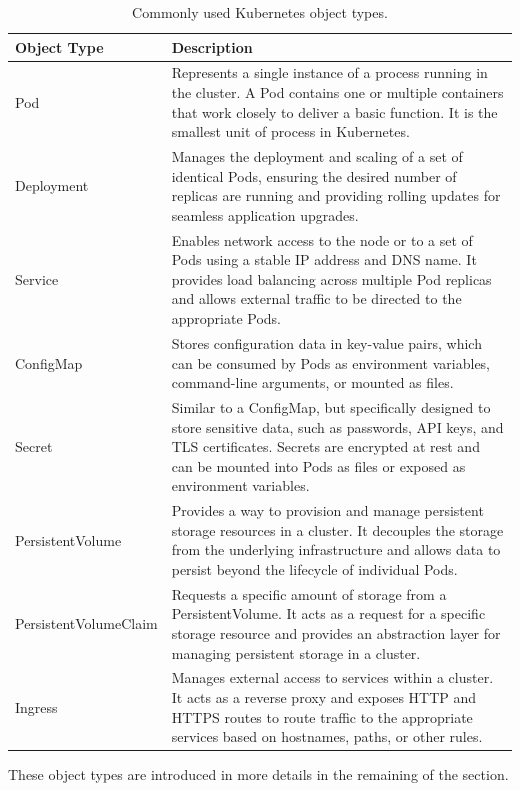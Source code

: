 \begin{table}[!htb]
	\centering
	\caption{Commonly used Kubernetes object types.} \label{ch:vac:tab:objtype}
	\begin{tabularx}{\textwidth}{lX}
		\hline
		Object Type & Description \\
		\hline
		Pod & Represents a single instance of a process running in the cluster. A Pod contains one or multiple containers that work closely to deliver a basic function. It is the smallest unit of process in Kubernetes. \\ \hline
		Deployment & Manages the deployment and scaling of a set of identical Pods, ensuring the desired number of replicas are running and providing rolling updates for seamless application upgrades. \\ \hline
		Service & Enables network access to the node or to a set of Pods using a stable IP address and DNS name. It provides load balancing across multiple Pod replicas and allows external traffic to be directed to the appropriate Pods. \\ \hline
		ConfigMap & Stores configuration data in key-value pairs, which can be consumed by Pods as environment variables, command-line arguments, or mounted as files. \\ \hline
		Secret & Similar to a ConfigMap, but specifically designed to store sensitive data, such as passwords, API keys, and TLS certificates. Secrets are encrypted at rest and can be mounted into Pods as files or exposed as environment variables. \\ \hline
		PersistentVolume & Provides a way to provision and manage persistent storage resources in a cluster. It decouples the storage from the underlying infrastructure and allows data to persist beyond the lifecycle of individual Pods. \\ \hline
		PersistentVolumeClaim & Requests a specific amount of storage from a PersistentVolume. It acts as a request for a specific storage resource and provides an abstraction layer for managing persistent storage in a cluster. \\ \hline
		Ingress & Manages external access to services within a cluster. It acts as a reverse proxy and exposes HTTP and HTTPS routes to route traffic to the appropriate services based on hostnames, paths, or other rules. \\
		\hline
	\end{tabularx}
\end{table}

These object types are introduced in more details in the remaining of the section.

